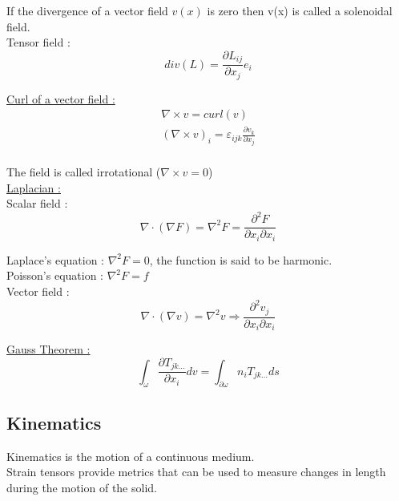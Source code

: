 \documentclass[../main.tex]{subfiles}
\begin{document}
If the divergence of a vector field $v(x)$ is zero then v(x) is called a solenoidal field.\\

Tensor field :
\begin{equation}
    div(L) = \frac{\partial L_{ij}}{\partial x_j} e_i
\end{equation}

\quad \underline{Curl of a vector field :}\\
\begin{equation}
\begin{gathered}
    \nabla \times v = curl(v)\\
    (\nabla \times v)_i = \varepsilon_{ijk} \frac{\partial v_k}{\partial x_j}\\
\end{gathered}
\end{equation}

The field is called irrotational ($\nabla \times v = 0$)\\

\quad \underline{Laplacian :}\\

Scalar field :
\begin{equation}
    \nabla \cdot (\nabla F) = \nabla^2 F = \frac{\partial^2 F}{\partial x_i \partial x_i}
\end{equation}

Laplace's equation : $\nabla^2 F=0$, the function is said to be harmonic.\\
Poisson's equation : $\nabla^2 F = f$\\

Vector field :
\begin{equation}
    \nabla \cdot (\nabla v) = \nabla^2 v \Rightarrow \frac{\partial^2 v_j}{\partial x_i \partial x_i}
\end{equation}

\quad \underline{Gauss Theorem :}\\
\begin{equation}
    \int_\omega \frac{\partial T_{jk \dots}}{\partial x_i}dv = \int_{\partial \omega} n_i T_{jk\dots}ds
\end{equation}

\subsection{Kinematics}
Kinematics is the motion of a continuous medium.\\
Strain tensors provide metrics that can be used to measure changes in length during the motion of the solid.\\
\end{document}
